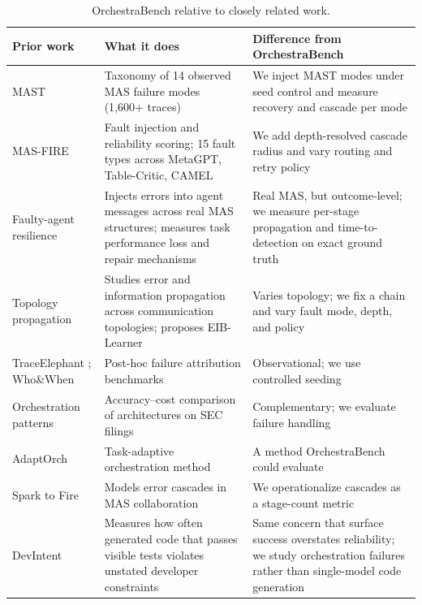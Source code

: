 \documentclass[11pt,a4paper]{article}
\begin{document}
\begin{table}[htbp]
  \centering
  \small
  \begin{tabularx}{\linewidth}{@{}p{3.2cm}XX@{}}
    \toprule
    Prior work & What it does & Difference from OrchestraBench \\
    \midrule
    MAST \citep{mast} & Taxonomy of 14 observed MAS failure modes (1{,}600+ traces) &
    We inject MAST modes under seed control and measure recovery and cascade per mode \\
    MAS-FIRE \citep{masfire} & Fault injection and reliability scoring; 15 fault
    types across MetaGPT, Table-Critic, CAMEL & We add depth-resolved cascade
    radius and vary routing and retry policy \\
    Faulty-agent resilience \citep{huang2025resilience} & Injects errors into agent
    messages across real MAS structures; measures task performance loss and
    repair mechanisms & Real MAS, but outcome-level; we measure per-stage
    propagation and time-to-detection on exact ground truth \\
    Topology propagation \citep{shen2025propagation} & Studies error and
    information propagation across communication topologies; proposes
    EIB-Learner & Varies topology; we fix a chain and vary fault mode, depth, and
    policy \\
    TraceElephant \citep{traceelephant}; Who\&When \citep{attribution} & Post-hoc
    failure attribution benchmarks & Observational; we use controlled seeding \\
    Orchestration patterns \citep{orchpattern} & Accuracy--cost comparison of
    architectures on SEC filings & Complementary; we evaluate failure handling \\
    AdaptOrch \citep{adaptorch} & Task-adaptive orchestration method & A method
    OrchestraBench could evaluate \\
    Spark to Fire \citep{sparkfire} & Models error cascades in MAS collaboration &
    We operationalize cascades as a stage-count metric \\
    DevIntent \citep{devintent} & Measures how often generated code that passes
    visible tests violates unstated developer constraints & Same concern that
    surface success overstates reliability; we study orchestration failures rather
    than single-model code generation \\
    \bottomrule
  \end{tabularx}
  \caption{OrchestraBench relative to closely related work.}
  \label{tab:related}
\end{table}
\end{document}
